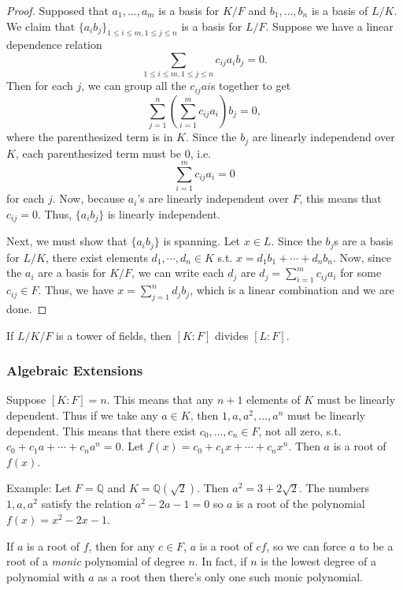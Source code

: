 \documentclass{scrartcl}
\begin{document}
\begin{proof}
    Supposed that $a_1,\dotsc,a_m$ is a basis for $K/F$ and $b_1,\dotsc,b_n$ is a basis of $L/K$. We claim that $\{a_ib_j\}_{1\le i\le m, 1\le j\le n}$ is a basis for $L/F$. Suppose we have a linear dependence relation $$\sum_{1\le i\le m, 1\le j\le n} c_{ij}a_ib_j = 0.$$
    Then for each $j$, we can group all the $c_{ij}a{i}$s together to get $$\sum_{j=1}^n \left(\sum_{i=1}^m c_{ij}a_i \right)b_j = 0,$$ where the parenthesized term is in $K$. Since the $b_j$ are linearly independend over $K$, each parenthesized term must be $0$, i.e. $$\sum_{i=1}^m c_{ij}a_i = 0$$ for each $j$. Now, because $a_i$'s are linearly independent over $F$, this means that $c_{ij} = 0$. Thus, $\{a_ib_j\}$ is linearly independent.
    
    Next, we must show that $\{a_ib_j\}$ is spanning. Let $x \in L$. Since the $b_j$s are a basis for $L/K$, there exist elements $d_1,\cdots,d_n \in K$ s.t. $x = d_1b_1 + \cdots + d_nb_n$. Now, since the $a_i$ are a basis for $K/F$, we can write each $d_j$ are $d_j = \sum_{i=1}^m c_{ij}a_i$ for some $c_{ij} \in F$. Thus, we have $x = \sum_{j=1}^n d_jb_j$, which is a linear combination and we are done.
\end{proof}

\begin{corollary}
    If $L/K/F$ is a tower of fields, then $[K:F]$ divides $[L:F]$.
\end{corollary}

\subsubsection{Algebraic Extensions}
Suppose $[K:F] = n$. This means that any $n+1$ elements of $K$ must be linearly dependent. Thus if we take any $a \in K$, then $1, a, a^2, \dotsc, a^n$ must be linearly dependent. This means that there exist $c_0, \dotsc, c_n \in F$, not all zero, s.t. $c_0 + c_1a + \cdots + c_na^n = 0$. Let $f(x) = c_0+c_1x+\cdots+c_nx^n$. Then $a$ is a root of $f(x)$.

Example: Let $F = \mathbb{Q}$ and $K = \mathbb{Q}(\sqrt{2})$. Then $a^2 = 3 + 2\sqrt{2}.$ The numbers $1,a,a^2$ satisfy the relation $a^2-2a-1 = 0$ so $a$ is a root of the polynomial $f(x) = x^2-2x-1$.

If $a$ is a root of $f$, then for any $c\in F$, $a$ is a root of $cf$, so we can force $a$ to be a root of a \textit{monic} polynomial of degree $n$. In fact, if $n$ is the lowest degree of a polynomial with $a$ as a root then there's only one such monic polynomial.
\end{document}
